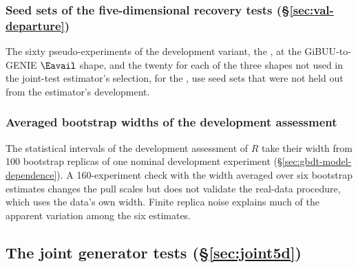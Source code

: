 \subsubsection{Seed sets of the five-dimensional recovery tests (\S\ref{sec:val-departure})}
\label{app:devhistory-recovery-seeds}

The sixty pseudo-experiments of the development variant, the \estLowCap{}, at the GiBUU-to-GENIE $\Eavail$ shape, and the twenty for each of the three shapes not used in the joint-test estimator's selection, for the \estMultiD{}, use seed sets that were not held out from the estimator's development.

\subsubsection{Averaged bootstrap widths of the development assessment}
\label{app:devhistory-5d-widths}

The statistical intervals of the development assessment of $R$ take their width from 100 bootstrap replicas of one nominal development experiment (\S\ref{sec:gbdt-model-dependence}). A 160-experiment check with the width averaged over six bootstrap estimates changes the pull scales but does not validate the real-data procedure, which uses the data's own width. Finite replica noise explains much of the apparent variation among the six estimates.

\subsection{The joint generator tests (\S\ref{sec:joint5d})}
\label{app:devhistory-joint}

